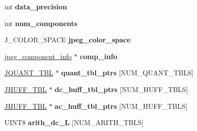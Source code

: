 \begin{DoxyCompactItemize}
\item 
int {\bfseries data\+\_\+precision}\hypertarget{structjpeg__compress__struct_a64c5b59e436f7d3d1d38b58d49993469}{}\label{structjpeg__compress__struct_a64c5b59e436f7d3d1d38b58d49993469}

\item 
int {\bfseries num\+\_\+components}\hypertarget{structjpeg__compress__struct_a524f0284a6fcf96b21c8a745282c15e2}{}\label{structjpeg__compress__struct_a524f0284a6fcf96b21c8a745282c15e2}

\item 
J\+\_\+\+C\+O\+L\+O\+R\+\_\+\+S\+P\+A\+CE {\bfseries jpeg\+\_\+color\+\_\+space}\hypertarget{structjpeg__compress__struct_a7fb5305ec135340eddc2ebabec6a84d7}{}\label{structjpeg__compress__struct_a7fb5305ec135340eddc2ebabec6a84d7}

\item 
\hyperlink{structjpeg__component__info}{jpeg\+\_\+component\+\_\+info} $\ast$ {\bfseries comp\+\_\+info}\hypertarget{structjpeg__compress__struct_a4d37d3f336cc11acafef541bf8ed38cc}{}\label{structjpeg__compress__struct_a4d37d3f336cc11acafef541bf8ed38cc}

\item 
\hyperlink{struct_j_q_u_a_n_t___t_b_l}{J\+Q\+U\+A\+N\+T\+\_\+\+T\+BL} $\ast$ {\bfseries quant\+\_\+tbl\+\_\+ptrs} \mbox{[}N\+U\+M\+\_\+\+Q\+U\+A\+N\+T\+\_\+\+T\+B\+LS\mbox{]}\hypertarget{structjpeg__compress__struct_a70a194c6a9c1744e1ed3a97232fb97f5}{}\label{structjpeg__compress__struct_a70a194c6a9c1744e1ed3a97232fb97f5}

\item 
\hyperlink{struct_j_h_u_f_f___t_b_l}{J\+H\+U\+F\+F\+\_\+\+T\+BL} $\ast$ {\bfseries dc\+\_\+huff\+\_\+tbl\+\_\+ptrs} \mbox{[}N\+U\+M\+\_\+\+H\+U\+F\+F\+\_\+\+T\+B\+LS\mbox{]}\hypertarget{structjpeg__compress__struct_a6a69e90a68e1f7f46774d83ba3737a4e}{}\label{structjpeg__compress__struct_a6a69e90a68e1f7f46774d83ba3737a4e}

\item 
\hyperlink{struct_j_h_u_f_f___t_b_l}{J\+H\+U\+F\+F\+\_\+\+T\+BL} $\ast$ {\bfseries ac\+\_\+huff\+\_\+tbl\+\_\+ptrs} \mbox{[}N\+U\+M\+\_\+\+H\+U\+F\+F\+\_\+\+T\+B\+LS\mbox{]}\hypertarget{structjpeg__compress__struct_a98d33cae3c8eee8f1f8d662e31cb905d}{}\label{structjpeg__compress__struct_a98d33cae3c8eee8f1f8d662e31cb905d}

\item 
U\+I\+N\+T8 {\bfseries arith\+\_\+dc\+\_\+L} \mbox{[}N\+U\+M\+\_\+\+A\+R\+I\+T\+H\+\_\+\+T\+B\+LS\mbox{]}\hypertarget{structjpeg__compress__struct_a736d867907116e88b3b38422fb2688c5}{}\label{structjpeg__compress__struct_a736d867907116e88b3b38422fb2688c5}


\end{DoxyCompactItemize}
